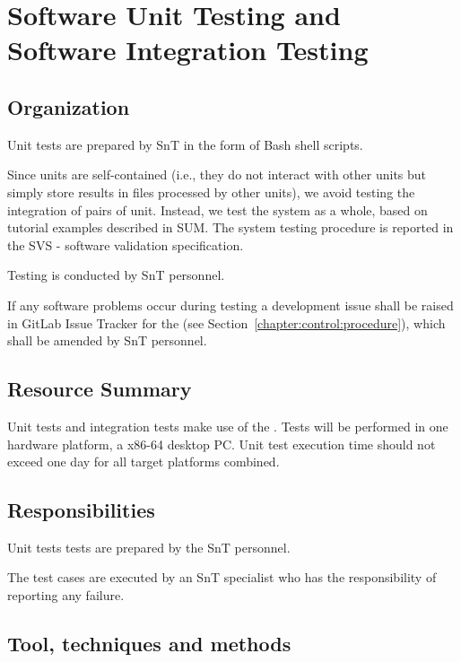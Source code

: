 
\chapter{Software Unit Testing and Software Integration Testing}

\section{Organization}
\label{sec:SUTSIT:org}

Unit tests are prepared by SnT in the form of Bash shell scripts. 

Since units are self-contained (i.e., they do not interact with other units but simply store results in files processed by other units), we avoid testing the integration of pairs of unit. Instead, we test the system as a whole, based on tutorial examples described in SUM. The system testing procedure is reported in the SVS - software validation specification.

Testing is conducted by SnT personnel.

If any software problems occur during testing a development issue shall be raised in GitLab Issue Tracker for the \FAQAS (see Section~\ref{chapter:control:procedure}), which shall be amended by SnT personnel.



\section{Resource Summary}

Unit tests and integration tests make use of the \FAQAS. Tests will be performed in one hardware platform, a x86-64 desktop PC. Unit test execution time should not exceed one day for all target platforms combined.

\section{Responsibilities}

Unit tests tests are prepared by the SnT personnel.

The test cases are executed by an SnT specialist who has the responsibility of reporting any failure.

\section{Tool, techniques and methods}

